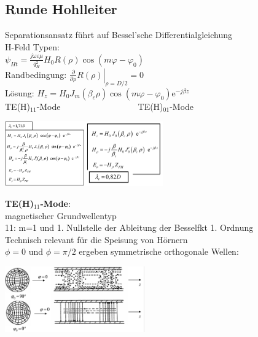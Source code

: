 \documentclass[english]{latex4ei/latex4ei_sheet}
\begin{document}
\begin{sectionbox}
    \subsection{Runde Hohlleiter}
    Separationsansatz führt auf Bessel'sche Differentialgleichung\\
    H-Feld Typen:\\
    $\psi_{H t}=\frac{j \omega \varepsilon \mu}{q_{H}^{2}} H_{0} R(\rho) \cos \left(m \varphi-\varphi_{0}\right)$\\
    Randbedingung: $\left.\frac{\partial}{\partial \rho} R(\rho)\right|_{\rho=D / 2}=0$\\
    Lösung: $H_{z}=H_{0} J_{m}\left(\beta_{c} \rho\right) \cos \left(m \varphi-\varphi_{0}\right) \mathrm{e}^{-j \beta z}$\\
    TE(H)$_{11}$-Mode$\quad\quad\quad\quad\quad\quad\quad\quad\quad$TE(H)$_{01}$-Mode
    \begin{center}\includegraphics[width = 3.4cm]{./img/hl-rund-h11.png}\includegraphics[width = 3.4cm]{./img/hl-rund-h01.jpeg}\end{center}
    \textbf{TE(H)$_{11}$-Mode}:\\
    magnetischer Grundwellentyp\\
    11: m=1 und 1. Nullstelle der Ableitung der Besselfkt 1. Ordnung\\
    Technisch relevant für die Speisung von Hörnern\\
    $\phi = 0$ und $\phi = \pi / 2$ ergeben symmetrische orthogonale Wellen:\\
    \begin{center}\includegraphics[width = 6cm]{./img/hl-rund-h11_2.png}\end{center}

\end{sectionbox}
\end{document}
